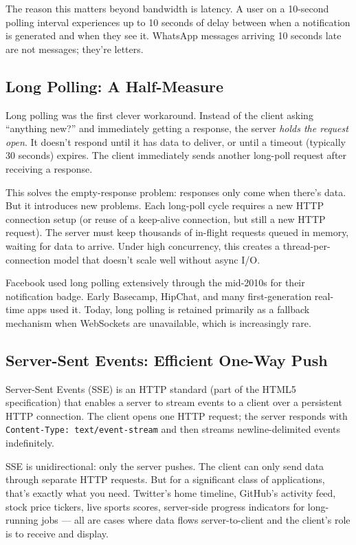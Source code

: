 \documentclass[11pt,a4paper]{article}
\begin{document}
The reason this matters beyond bandwidth is latency. A user on a 10-second polling interval experiences up to 10 seconds of delay between when a notification is generated and when they see it. WhatsApp messages arriving 10 seconds late are not messages; they're letters.

\subsection{Long Polling: A Half-Measure}

Long polling was the first clever workaround. Instead of the client asking ``anything new?'' and immediately getting a response, the server \emph{holds the request open}. It doesn't respond until it has data to deliver, or until a timeout (typically 30 seconds) expires. The client immediately sends another long-poll request after receiving a response.

This solves the empty-response problem: responses only come when there's data. But it introduces new problems. Each long-poll cycle requires a new HTTP connection setup (or reuse of a keep-alive connection, but still a new HTTP request). The server must keep thousands of in-flight requests queued in memory, waiting for data to arrive. Under high concurrency, this creates a thread-per-connection model that doesn't scale well without async I/O.

Facebook used long polling extensively through the mid-2010s for their notification badge. Early Basecamp, HipChat, and many first-generation real-time apps used it. Today, long polling is retained primarily as a fallback mechanism when WebSockets are unavailable, which is increasingly rare.

\subsection{Server-Sent Events: Efficient One-Way Push}

Server-Sent Events (SSE) is an HTTP standard (part of the HTML5 specification) that enables a server to stream events to a client over a persistent HTTP connection. The client opens one HTTP request; the server responds with \texttt{Content-Type: text/event-stream} and then streams newline-delimited events indefinitely.

SSE is unidirectional: only the server pushes. The client can only send data through separate HTTP requests. But for a significant class of applications, that's exactly what you need. Twitter's home timeline, GitHub's activity feed, stock price tickers, live sports scores, server-side progress indicators for long-running jobs --- all are cases where data flows server-to-client and the client's role is to receive and display.
\end{document}
